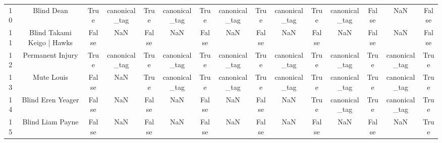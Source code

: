 \begin{table}[h!]
{\begin{tabular}{|c|c|c|c|c|c|c|c|c|c|c|c|c|c|c|}
         10 &                                        Blind Dean &                           True &             canonical\_tag &                           True &             canonical\_tag &                           True &             canonical\_tag &                           True &             canonical\_tag &                           True &             canonical\_tag &                          False &                       NaN &                          False \\
         11 &                        Blind Takami Keigo | Hawks &                          False &                       NaN &                          False &                       NaN &                          False &                       NaN &                          False &                       NaN &                          False &                       NaN &                          False &                       NaN &                          False \\
         12 &                                  Permanent Injury &                           True &             canonical\_tag &                           True &             canonical\_tag &                           True &             canonical\_tag &                           True &             canonical\_tag &                           True &             canonical\_tag &                           True &             canonical\_tag &                           True \\
         13 &                                        Mute Louis &                          False &                       NaN &                           True &             canonical\_tag &                           True &             canonical\_tag &                           True &             canonical\_tag &                           True &             canonical\_tag &                           True &             canonical\_tag &                           True \\
         14 &                                 Blind Eren Yeager &                          False &                       NaN &                          False &                       NaN &                          False &                       NaN &                          False &                       NaN &                           True &             canonical\_tag &                           True &             canonical\_tag &                           True \\
         15 &                                  Blind Liam Payne &                          False &                       NaN &                          False &                       NaN &                          False &                       NaN &                          False &                       NaN &                          False &                       NaN &                          False &                       NaN &                           True \\

\end{tabular}}
\end{table}
